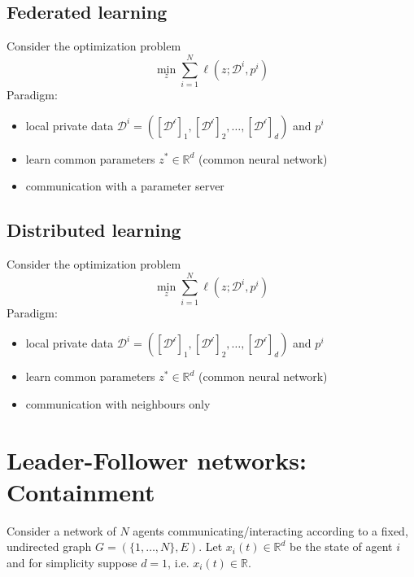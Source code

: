 \documentclass{book}
\newcommand{\R}{\mathbb{R}}
\theoremstyle{theoremv2}
\theoremstyle{defv2}
\theoremstyle{remark}
\theoremstyle{remark}
\theoremstyle{definition}
\theoremstyle{definition}
\begin{document}
\section{Federated learning}
Consider the optimization problem 
\[
    \min_z \displaystyle\sum_{i=1}^{N}\ell(z;\mathcal{D}^i,p^i)
\]
Paradigm:
\begin{itemize}
    \item local private data $\mathcal{D}^i = ([\mathcal{D^i}]_1,[\mathcal{D^i}]_2,\dots,[\mathcal{D^i}]_d)$ and $p^i$
    \item learn common parameters $z^*\in\R^d$ (common neural network)
    \item communication with a parameter server
\end{itemize}

\section{Distributed learning}
Consider the optimization problem 
\[
    \min_z \displaystyle\sum_{i=1}^{N}\ell(z;\mathcal{D}^i,p^i)
\]
Paradigm:
\begin{itemize}
    \item local private data $\mathcal{D}^i = ([\mathcal{D^i}]_1,[\mathcal{D^i}]_2,\dots,[\mathcal{D^i}]_d)$ and $p^i$
    \item learn common parameters $z^*\in\R^d$ (common neural network)
    \item communication with neighbours only
\end{itemize}


\chapter{Leader-Follower networks: Containment}
Consider a network of $N$ agents communicating/interacting according to a fixed, undirected graph $G=(\{1,\dots,N\},E)$. Let $x_i(t)\in\R^d$ be the state of agent $i$ and for simplicity suppose $d=1$, i.e. $x_i(t)\in\R$.
\end{document}
